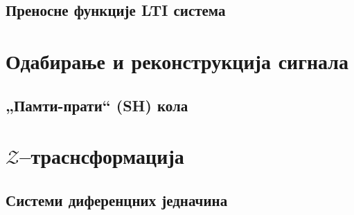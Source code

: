 \setcounter{fid}{0}
\graphicspath{{./4_laplasova_transformacija/2_sistemi_dif_jna/}}
\noindent

\vspace*{\ProblemSep}
\subsection{Преносне функције LTI система}

\setcounter{fid}{0}
\graphicspath{{./4_laplasova_transformacija/3_fje_prenosa/}}
\noindent

\vspace*{\ProblemSep}
\section{Одабирање и реконструкција сигнала}
\subsection{„Памти-прати“ (SH) кола}

\setcounter{fid}{0}
\graphicspath{{./5_odabiranje/1_kola/}}
\noindent

\vspace*{\ProblemSep}
\section{$\mathcal{Z}$--траснсформација}
\subsection{Системи диференцних једначина}

\setcounter{fid}{0}
\graphicspath{{./6_z_transformacija/2_sistemi/}}
\noindent

\vspace*{\ProblemSep}
\appendix
\appendix
\graphicspath{{./100_appendix/}}



